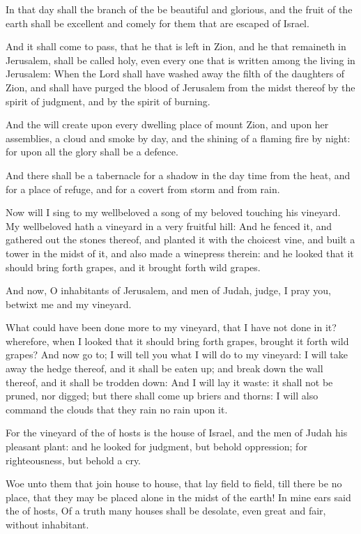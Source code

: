 \Verse In that day shall the branch of the \LORD be beautiful and glorious, and the fruit of the earth shall be excellent and comely for them that are escaped of Israel.

\Verse And it shall come to pass, that he that is left in Zion, and he that remaineth in Jerusalem, shall be called holy, even every one that is written among the living in Jerusalem: \Verse When the Lord shall have washed away the filth of the daughters of Zion, and shall have purged the blood of Jerusalem from the midst thereof by the spirit of judgment, and by the spirit of burning.

\Verse And the \LORD will create upon every dwelling place of mount Zion, and upon her assemblies, a cloud and smoke by day, and the shining of a flaming fire by night: for upon all the glory shall be a defence.

\Verse And there shall be a tabernacle for a shadow in the day time from the heat, and for a place of refuge, and for a covert from storm and from rain.


\Chapter
\Verse Now will I sing to my wellbeloved a song of my beloved touching his vineyard. My wellbeloved hath a vineyard in a very fruitful hill: \Verse And he fenced it, and gathered out the stones thereof, and planted it with the choicest vine, and built a tower in the midst of it, and also made a winepress therein: and he looked that it should bring forth grapes, and it brought forth wild grapes.

\Verse And now, O inhabitants of Jerusalem, and men of Judah, judge, I pray you, betwixt me and my vineyard.

\Verse What could have been done more to my vineyard, that I have not done in it? wherefore, when I looked that it should bring forth grapes, brought it forth wild grapes?  \Verse And now go to; I will tell you what I will do to my vineyard: I will take away the hedge thereof, and it shall be eaten up; and break down the wall thereof, and it shall be trodden down: \Verse And I will lay it waste: it shall not be pruned, nor digged; but there shall come up briers and thorns: I will also command the clouds that they rain no rain upon it.

\Verse For the vineyard of the \LORD of hosts is the house of Israel, and the men of Judah his pleasant plant: and he looked for judgment, but behold oppression; for righteousness, but behold a cry.

\Verse Woe unto them that join house to house, that lay field to field, till there be no place, that they may be placed alone in the midst of the earth!  \Verse In mine ears said the \LORD of hosts, Of a truth many houses shall be desolate, even great and fair, without inhabitant.

